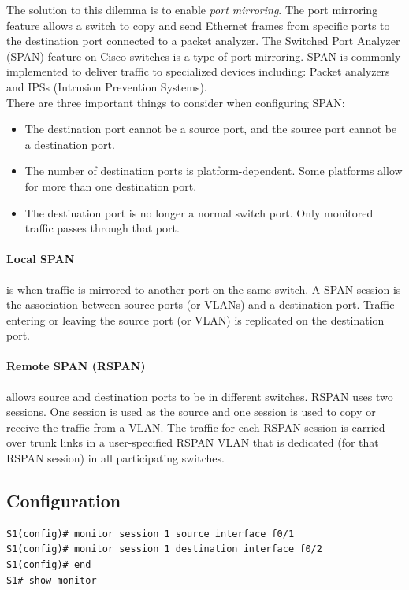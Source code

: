 The solution to this dilemma is to enable \emph{port mirroring}. The port mirroring feature allows a switch to copy and send Ethernet frames from specific ports to the destination port connected to a packet analyzer. The Switched Port Analyzer (SPAN) feature on Cisco switches is a type of port mirroring. SPAN is commonly implemented to deliver traffic to specialized devices including: Packet analyzers and IPSs (Intrusion Prevention Systems).\\

There are three important things to consider when configuring SPAN:
\begin{itemize}
\item The destination port cannot be a source port, and the source port cannot be a destination port.
\item The number of destination ports is platform-dependent. Some platforms allow for more than one destination port.
\item The destination port is no longer a normal switch port. Only monitored traffic passes through that port.
\end{itemize}

\paragraph{Local SPAN} is when traffic is mirrored to another port on the same switch. A SPAN session is the association between source ports (or VLANs) and a destination port. Traffic entering or leaving the source port (or VLAN) is replicated on the destination port. 

\paragraph{Remote SPAN (RSPAN)} allows source and destination ports to be in different switches. RSPAN uses two sessions. One session is used as the source and one session is used to copy or receive the traffic from a VLAN. The traffic for each RSPAN session is carried over trunk links in a user-specified RSPAN VLAN that is dedicated (for that RSPAN session) in all participating switches. 

\subsection{Configuration}

\begin{verbatim}
S1(config)# monitor session 1 source interface f0/1
S1(config)# monitor session 1 destination interface f0/2
S1(config)# end
S1# show monitor
\end{verbatim}

